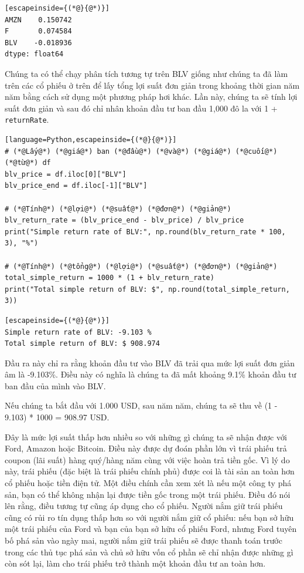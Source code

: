 \begin{lstlisting}[escapeinside={(*@}{@*)}]
AMZN    0.150742
F       0.074584
BLV    -0.018936
dtype: float64
\end{lstlisting}

Chúng ta có thể chạy phân tích tương tự trên BLV giống như chúng ta đã làm trên các cổ phiếu ở trên để lấy tổng lợi suất đơn giản trong khoảng thời gian năm năm bằng cách sử dụng một phương pháp hơi khác. Lần này, chúng ta sẽ tính lợi suất đơn giản và sau đó chỉ nhân khoản đầu tư ban đầu 1,000 đô la với 1 + \texttt{returnRate}.

\begin{lstlisting}[language=Python,escapeinside={(*@}{@*)}]
# (*@Lấy@*) (*@giá@*) ban (*@đầu@*) (*@và@*) (*@giá@*) (*@cuối@*) (*@từ@*) df
blv_price = df.iloc[0]["BLV"]
blv_price_end = df.iloc[-1]["BLV"]

# (*@Tính@*) (*@lợi@*) (*@suất@*) (*@đơn@*) (*@giản@*)
blv_return_rate = (blv_price_end - blv_price) / blv_price
print("Simple return rate of BLV:", np.round(blv_return_rate * 100, 3), "%")

# (*@Tính@*) (*@tổng@*) (*@lợi@*) (*@suất@*) (*@đơn@*) (*@giản@*)
total_simple_return = 1000 * (1 + blv_return_rate)
print("Total simple return of BLV: $", np.round(total_simple_return, 3))
\end{lstlisting}

\begin{lstlisting}[escapeinside={(*@}{@*)}]
Simple return rate of BLV: -9.103 %
Total simple return of BLV: $ 908.974
\end{lstlisting}

Đầu ra này chỉ ra rằng khoản đầu tư vào BLV đã trải qua mức lợi suất đơn giản âm là -9.103\%. Điều này có nghĩa là chúng ta đã mất khoảng 9.1\% khoản đầu tư ban đầu của mình vào BLV.

Nếu chúng ta bắt đầu với 1.000 USD, sau năm năm, chúng ta sẽ thu về (1 - 9.103) * 1000 = 908.97 USD.

Đây là mức lợi suất thấp hơn nhiều so với những gì chúng ta sẽ nhận được với Ford, Amazon hoặc Bitcoin. Điều này được dự đoán phần lớn vì trái phiếu trả coupon (lãi suất) hàng quý/hàng năm cùng với việc hoàn trả tiền gốc. Vì lý do này, trái phiếu (đặc biệt là trái phiếu chính phủ) được coi là tài sản an toàn hơn cổ phiếu hoặc tiền điện tử. Một điều chính cần xem xét là nếu một công ty phá sản, bạn có thể không nhận lại được tiền gốc trong một trái phiếu. Điều đó nói lên rằng, điều tương tự cũng áp dụng cho cổ phiếu. Người nắm giữ trái phiếu cũng có rủi ro tín dụng thấp hơn so với người nắm giữ cổ phiếu: nếu bạn sở hữu một trái phiếu của Ford và bạn của bạn sở hữu cổ phiếu Ford, nhưng Ford tuyên bố phá sản vào ngày mai, người nắm giữ trái phiếu sẽ được thanh toán trước trong các thủ tục phá sản và chủ sở hữu vốn cổ phần sẽ chỉ nhận được những gì còn sót lại, làm cho trái phiếu trở thành một khoản đầu tư an toàn hơn.

